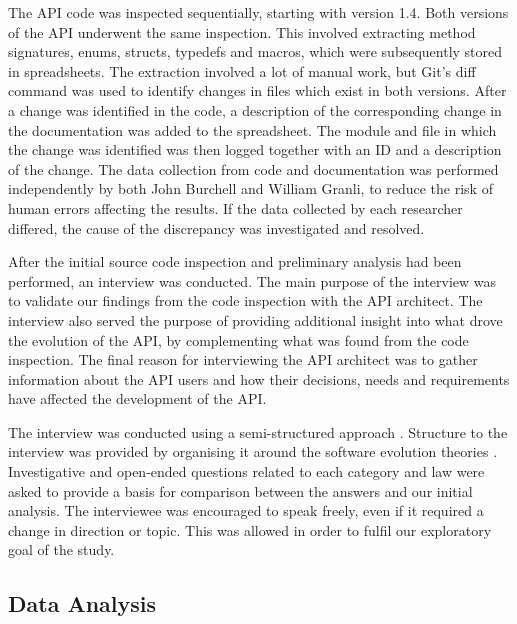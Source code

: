 \documentclass{sig-alternate}
\begin{document}
The API code was inspected sequentially, starting with version 1.4. Both versions of the API underwent the same inspection. This involved extracting method signatures, enums, structs, typedefs and macros, which were subsequently stored in spreadsheets. The extraction involved a lot of manual work, but Git's \cite{git} diff command was used to identify changes in files which exist in both versions. After a change was identified in the code, a description of the corresponding change in the documentation was added to the spreadsheet. The module and file in which the change was identified was then logged together with an ID and a description of the change. The data collection from code and documentation was performed independently by both John Burchell and William Granli, to reduce the risk of human errors affecting the results. If the data collected by each researcher differed, the cause of the discrepancy was investigated and resolved. 

After the initial source code inspection and preliminary analysis had been performed, an interview was conducted. The main purpose of the interview was to validate our findings from the code inspection with the API architect. The interview also served the purpose of providing additional insight into what drove the evolution of the API, by complementing what was found from the code inspection. The final reason for interviewing the API architect was to gather information about the API users and how their decisions, needs and requirements have affected the development of the API. 

The interview was conducted using a semi-structured approach \cite{robson2002real}. Structure to the interview was provided by organising it around the software evolution theories \cite{chapin2001types, lehman90sview}. Investigative and open-ended questions related to each category and law were asked to provide a basis for comparison between the answers and our initial analysis. The interviewee was encouraged to speak freely, even if it required a change in direction or topic. This was allowed in order to fulfil our exploratory goal of the study. 




\subsection{Data Analysis} \label{data_analysis}
\end{document}
